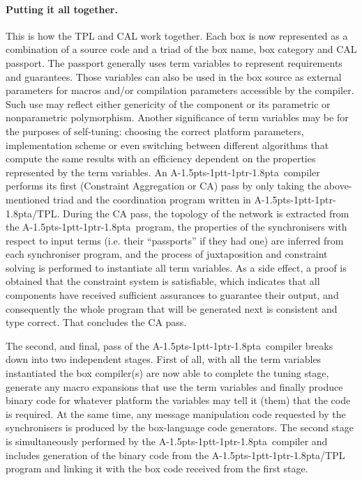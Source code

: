 \documentclass[11pt]{report}
\def\ak{{\textsf{A\kern-1.5pts\kern-1ptt\kern-1ptr\kern-1.8pta}}\kern-2pt{\it K\kern-2ptahn}}
\begin{document}
\paragraph{Putting it all together.} This is how the TPL and CAL work together. Each box is now represented as a combination of a source code and a triad of the box name, box category and  CAL passport. The passport generally uses term variables to represent requirements and guarantees. Those variables can also be used in the box source as external parameters for macros and/or compilation parameters accessible by the compiler. Such use may reflect either genericity of the component or its parametric or nonparametric polymorphism. Another significance of term variables may be for the purposes of self-tuning: choosing the correct platform parameters, implementation scheme or even switching between different algorithms that compute the same results with an efficiency dependent on the properties represented by the term variables. An \ak\ compiler performs its first (Constraint Aggregation or CA) pass by only taking the above-mentioned triad and the coordination program written in \ak/TPL. During the CA pass, the topology of the network is extracted from the \ak\ program, the properties of the synchronisers with respect to input terms (i.e. their ``passports'' if they had one) are inferred from each synchroniser program, and the process of juxtaposition and constraint solving is performed to instantiate all term variables. As a side effect, a proof is obtained that the constraint system is satisfiable, which indicates that all components have received sufficient assurances to guarantee their output, and consequently the whole program that will be generated next is consistent and type correct. That concludes the CA pass.

The second, and final,  pass of the \ak\ compiler breaks down into two independent stages. First of all, with all the term variables instantiated the box compiler(s) are now able to complete the tuning stage, generate any macro expansions that use the term variables and finally produce binary code for whatever platform the variables may tell it (them) that the code 
is required. At the same time, any message manipulation code requested by the synchronisers is produced by the 
box-language code generators. The second stage is simultaneously performed by the \ak\ compiler and includes 
generation of the binary code from the \ak/TPL program and linking it with the box code received from the first stage.
\end{document}
